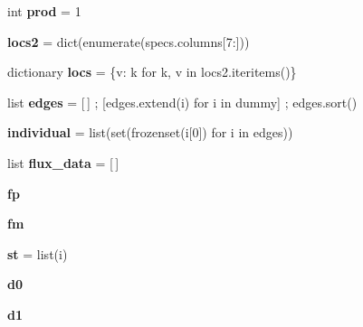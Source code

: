 \begin{DoxyCompactItemize}
\item 
\mbox{\label{namespaceropa__tool_a917154385184f61915d23cdc706846df}} 
int {\bfseries prod} = 1
\item 
\mbox{\label{namespaceropa__tool_a44fe1e772799c026cdf648e6463afb11}} 
{\bfseries locs2} = dict(enumerate(specs.\+columns\mbox{[}7\+:\mbox{]}))
\item 
\mbox{\label{namespaceropa__tool_aa265eeef6d2283d267ba274db92e10a4}} 
dictionary {\bfseries locs} = \{v\+: k for k, v in locs2.\+iteritems()\}
\item 
\mbox{\label{namespaceropa__tool_a23910c8464443305b1f90033d3ba7c86}} 
list {\bfseries edges} = \mbox{[}$\,$\mbox{]} ; \mbox{[}edges.\+extend(i) for i in dummy\mbox{]} ; edges.\+sort()
\item 
\mbox{\label{namespaceropa__tool_aff74371a2e21e538002f968ad0130b2b}} 
{\bfseries individual} = list(set(frozenset(i\mbox{[}0\mbox{]}) for i in edges))
\item 
\mbox{\label{namespaceropa__tool_af610fc0f3881d18e9a9869c3ca882b3e}} 
list {\bfseries flux\+\_\+data} = \mbox{[}$\,$\mbox{]}
\item 
\mbox{\label{namespaceropa__tool_ae42ef391fe5e91917b8ffdeb7fd78c49}} 
{\bfseries fp}
\item 
\mbox{\label{namespaceropa__tool_a8b71524a24560ba6350950743b667748}} 
{\bfseries fm}
\item 
\mbox{\label{namespaceropa__tool_ad9f2f4638099d187a54615d1d42e3950}} 
{\bfseries st} = list(i)
\item 
\mbox{\label{namespaceropa__tool_ab05a7e18e5f429465edc855ee661d07a}} 
{\bfseries d0}
\item 
\mbox{\label{namespaceropa__tool_a20b395818e9c0c82f9c68147f0ca5654}} 
{\bfseries d1}
\item 
\mbox{\label{namespaceropa__tool_a930b3036e788dae38c7d49885e3d9832}} 

\end{DoxyCompactItemize}
